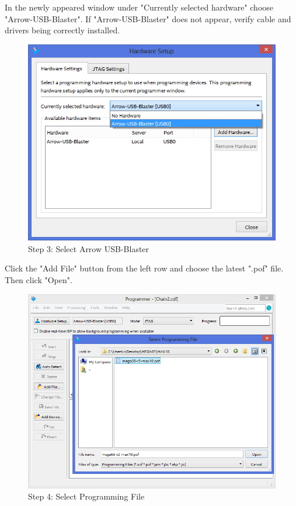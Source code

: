 In the newly appeared window under "Currently selected hardware" choose "Arrow-USB-Blaster".
If "Arrow-USB-Blaster" does not appear, verify cable and drivers being correctly installed.

\begin{figure}
  \includegraphics[width=\linewidth]{images/max10_03.png}
  \caption{Step 3: Select Arrow USB-Blaster}
  \label{fig:max10_03}
\end{figure}

Click the "Add File" button from the left row and choose the latest ".pof" file. Then click "Open".

\begin{figure}
  \includegraphics[width=\linewidth]{images/max10_04.png}
  \caption{Step 4: Select Programming File}
  \label{fig:max10_04}
\end{figure}

